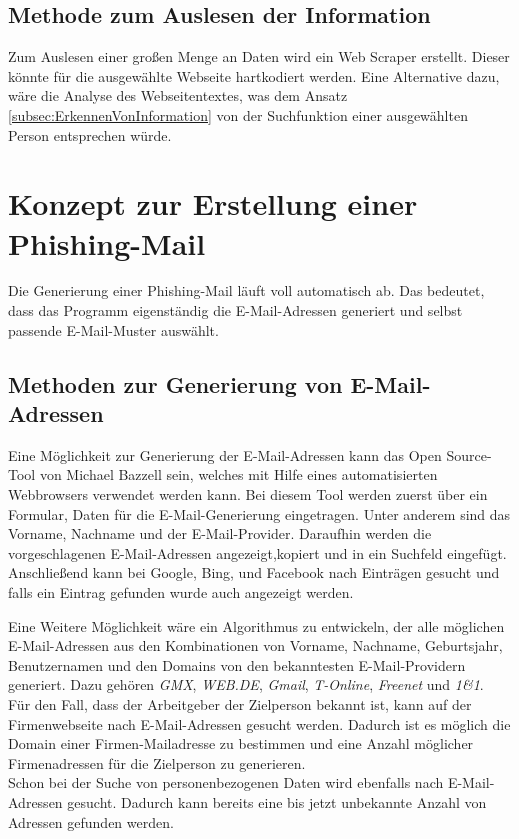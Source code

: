 	\subsection{Methode zum Auslesen der Information}
	Zum Auslesen einer großen Menge an Daten wird ein Web Scraper erstellt. Dieser könnte für die ausgewählte Webseite hartkodiert werden. Eine Alternative dazu, wäre die Analyse des Webseitentextes, was dem Ansatz \ref{subsec:ErkennenVonInformation} von der Suchfunktion einer ausgewählten Person entsprechen würde.

\section{Konzept zur Erstellung einer Phishing-Mail}
Die Generierung einer Phishing-Mail läuft voll automatisch ab. Das bedeutet, dass das Programm eigenständig die E-Mail-Adressen generiert und selbst passende E-Mail-Muster auswählt.
	\subsection{Methoden zur Generierung von E-Mail-Adressen}
	Eine Möglichkeit zur Generierung der E-Mail-Adressen kann das Open Source-Tool von Michael Bazzell \cite{EmailAssumptions} sein, welches mit Hilfe eines automatisierten Webbrowsers verwendet werden kann. Bei diesem Tool werden zuerst über ein Formular, Daten für die E-Mail-Generierung eingetragen. Unter anderem sind das Vorname, Nachname und der E-Mail-Provider. Daraufhin werden die vorgeschlagenen E-Mail-Adressen angezeigt,kopiert und in ein Suchfeld eingefügt. Anschließend kann bei Google, Bing, und Facebook nach Einträgen gesucht und falls ein Eintrag gefunden wurde auch angezeigt werden.

	Eine Weitere Möglichkeit wäre ein Algorithmus zu entwickeln, der alle möglichen E-Mail-Adressen aus den Kombinationen von Vorname, Nachname, Geburtsjahr, Benutzernamen und den Domains von den bekanntesten E-Mail-Providern generiert. Dazu gehören \textit{GMX}, \textit{WEB.DE}, \textit{Gmail}, \textit{T-Online}, \textit{Freenet} und \textit{1\&1}.\cite{AnbieterMail} \\
	Für den Fall, dass der Arbeitgeber der Zielperson bekannt ist, kann auf der Firmenwebseite nach E-Mail-Adressen gesucht werden. Dadurch ist es möglich die Domain einer Firmen-Mailadresse zu bestimmen und eine Anzahl  möglicher Firmenadressen für die Zielperson zu generieren.\\
	Schon bei der Suche von personenbezogenen Daten wird ebenfalls nach E-Mail-Adressen gesucht. Dadurch kann bereits eine bis jetzt unbekannte Anzahl von Adressen gefunden werden.

